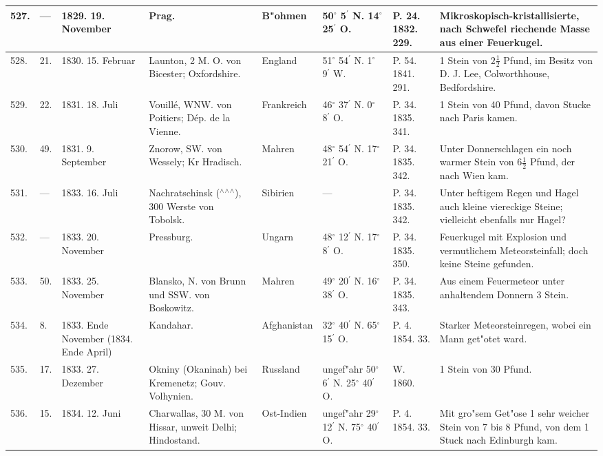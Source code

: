 \documentclass[a4paper, 8pt, oneside, polutonikogreek, german]{article}
\begin{document}
\begin{center}
\begin{longtable}{| p{5mm} | p{3mm} | p{15mm} | p{25mm} | p{20mm} | p{14mm} | p{17mm} | p{24mm} |}
        527. & --- & 1829. 19. November & Prag. & B"ohmen & 50$^\circ$ 5$^\prime$ N. 14$^\circ$ 25$^\prime$ O. & P. 24. 1832. 229. & Mikroskopisch-kristallisierte, nach Schwefel riechende Masse aus einer Feuerkugel. \\ \hline
        528. & 21. & 1830. 15. Februar & Launton, 2 M. O. von Bicester; Oxfordshire. & England & 51$^\circ$ 54$^\prime$ N. 1$^\circ$ 9$^\prime$ W. & P. 54. 1841. 291. & 1 Stein von $2\frac{1}{2}$ Pfund, im Besitz von D. J. Lee, Colworthhouse, Bedfordshire. \\ \hline
        529. & 22. & 1831. 18. Juli & Vouillé, WNW. von Poitiers; Dép. de la Vienne. & Frankreich & 46$^\circ$ 37$^\prime$ N. 0$^\circ$ 8$^\prime$ O. & P. 34. 1835. 341. & 1 Stein von 40 Pfund, davon Stucke nach Paris kamen. \\ \hline
        530. & 49. & 1831. 9. September & Znorow, SW. von Wessely; Kr Hradisch. & Mahren & 48$^\circ$ 54$^\prime$ N. 17$^\circ$ 21$^\prime$ O. & P. 34. 1835. 342. & Unter Donnerschlagen ein noch warmer Stein von $6\frac{1}{2}$ Pfund, der nach Wien kam. \\ \hline
        531. & --- & 1833. 16. Juli & Nachratschinsk ($^\wedge$$^\wedge$$^\wedge$), 300 Werste von Tobolsk. & Sibirien & --- & P. 34. 1835. 342. & Unter heftigem Regen und Hagel auch kleine viereckige Steine; vielleicht ebenfalls nur Hagel? \\ \hline
        532. & --- & 1833. 20. November & Pressburg. & Ungarn & 48$^\circ$ 12$^\prime$ N. 17$^\circ$ 8$^\prime$ O. & P. 34. 1835. 350. & Feuerkugel mit Explosion und vermutlichem Meteorsteinfall; doch keine Steine gefunden. \\ \hline
        533. & 50. & 1833. 25. November & Blansko, N. von Brunn und SSW. von Boskowitz. & Mahren & 49$^\circ$ 20$^\prime$ N. 16$^\circ$ 38$^\prime$ O. & P. 34. 1835. 343. & Aus einem Feuermeteor unter anhaltendem Donnern 3 Stein. \\ \hline
        534. & 8. & 1833. Ende November (1834. Ende April) & Kandahar. & Afghanistan & 32$^\circ$ 40$^\prime$ N. 65$^\circ$ 15$^\prime$ O. & P. 4. 1854. 33. & Starker Meteorsteinregen, wobei ein Mann get"otet ward. \\ \hline
        535. & 17. & 1833. 27. Dezember & Okniny (Okaninah) bei Kremenetz; Gouv. Volhynien. & Russland & ungef"ahr 50$^\circ$ 6$^\prime$ N. 25$^\circ$ 40$^\prime$ O. & W. 1860. & 1 Stein von 30 Pfund. \\ \hline
        536. & 15. & 1834. 12. Juni & Charwallas, 30 M. von Hissar, unweit Delhi; Hindostand. & Ost-Indien & ungef"ahr 29$^\circ$ 12$^\prime$ N. 75$^\circ$ 40$^\prime$ O. & P. 4. 1854. 33. & Mit gro"sem Get"ose 1 sehr weicher Stein von 7 bis 8 Pfund, von dem 1 Stuck nach Edinburgh kam. \\ \hline

\end{longtable}
\end{center}
\end{document}
